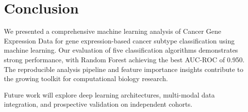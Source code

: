 \documentclass[conference]{IEEEtran}
\begin{document}
\section{Conclusion}

We presented a comprehensive machine learning analysis of Cancer Gene Expression Data
for gene expression-based cancer subtype classification using machine learning. Our evaluation of five classification algorithms
demonstrates strong performance, with Random Forest achieving the best AUC-ROC
of 0.950.
The reproducible analysis pipeline and feature importance insights contribute
to the growing toolkit for computational biology research.

Future work will explore deep learning architectures, multi-modal data integration,
and prospective validation on independent cohorts.



\end{document}
